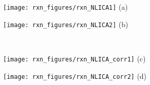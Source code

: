 \documentclass[]{article}
\begin{document}
\centering
\begin{minipage}{0.4\textwidth}
\centering
    \texttt{[image: rxn\_figures/rxn\_NLICA1]}
(a)
\end{minipage}
\begin{minipage}{0.4\textwidth}
\centering
      \texttt{[image: rxn\_figures/rxn\_NLICA2]}
(b)
\end{minipage}\\
\begin{minipage}{0.4\textwidth}
\centering
\texttt{[image: rxn\_figures/rxn\_NLICA\_corr1]}
(c)
\end{minipage}
\begin{minipage}{0.4\textwidth}
\centering
  \texttt{[image: rxn\_figures/rxn\_NLICA\_corr2]}
(d)
\end{minipage}
\end{document}
